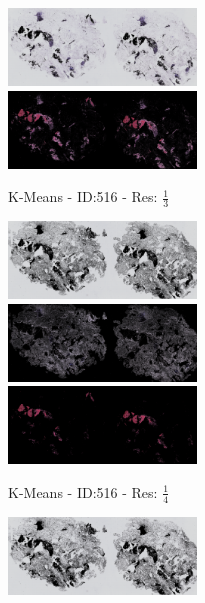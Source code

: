 \documentclass[a4paper,10pt,oneside]{article}
\begin{document}
\begin{figure}[hbtp]
  \centering
  \begin{subfigure}[b]{5cm}
    \includegraphics[width=5cm]{visualization/results/kmeans/res_reduce_3/Region_1_PO13-00516A1_1_7_201305171148.png}
    \includegraphics[width=5cm]{visualization/results/kmeans/res_reduce_3/Region_2_PO13-00516A1_1_7_201305171148.png}
    \caption{K-Means - ID:516 - Res: $\frac{1}{3}$}
  \end{subfigure}
  \begin{subfigure}[b]{5cm}
    \includegraphics[width=5cm]{visualization/results/kmeans/res_reduce_4/Region_0_PO13-00516A1_1_7_201305171148.png}
    \includegraphics[width=5cm]{visualization/results/kmeans/res_reduce_4/Region_1_PO13-00516A1_1_7_201305171148.png}
    \includegraphics[width=5cm]{visualization/results/kmeans/res_reduce_4/Region_2_PO13-00516A1_1_7_201305171148.png}
    \caption{K-Means - ID:516 - Res: $\frac{1}{4}$}
  \end{subfigure}
  \begin{subfigure}[b]{5cm}
    \includegraphics[width=5cm]{visualization/results/kmeans/res_reduce_5/Region_2_PO13-00516A1_1_7_201305171148.png}

\end{subfigure}
\end{figure}
\end{document}
